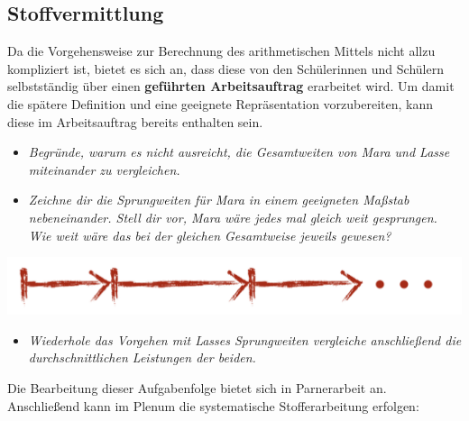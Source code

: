 \documentclass[
]{scrbook}
\providecommand{\tightlist}{%
  \setlength{\itemsep}{0pt}\setlength{\parskip}{0pt}}
\theoremstyle{definition}
\theoremstyle{definition}
\theoremstyle{definition}
\theoremstyle{definition}
\theoremstyle{remark}
\begin{document}
\subsection{Stoffvermittlung}\label{stoffvermittlung}

Da die Vorgehensweise zur Berechnung des arithmetischen Mittels nicht allzu kompliziert ist, bietet es sich an, dass diese von den Schülerinnen und Schülern selbstständig über einen \textbf{geführten Arbeitsauftrag} erarbeitet wird. Um damit die spätere Definition und eine geeignete Repräsentation vorzubereiten, kann diese im Arbeitsauftrag bereits enthalten sein.

\begin{itemize}
\tightlist
\item
  \emph{Begründe, warum es nicht ausreicht, die Gesamtweiten von Mara und Lasse miteinander zu vergleichen.}\\
\item
  \emph{Zeichne dir die Sprungweiten für Mara in einem geeigneten Maßstab nebeneinander. Stell dir vor, Mara wäre jedes mal gleich weit gesprungen. Wie weit wäre das bei der gleichen Gesamtweise jeweils gewesen?}
\end{itemize}

\begin{center}\includegraphics[width=0.5\linewidth]{pictures/B-Einfuehrung} \end{center}

\begin{itemize}
\tightlist
\item
  \emph{Wiederhole das Vorgehen mit Lasses Sprungweiten vergleiche anschließend die durchschnittlichen Leistungen der beiden.}
\end{itemize}

Die Bearbeitung dieser Aufgabenfolge bietet sich in Parnerarbeit an. Anschließend kann im Plenum die systematische Stofferarbeitung erfolgen:
\end{document}
